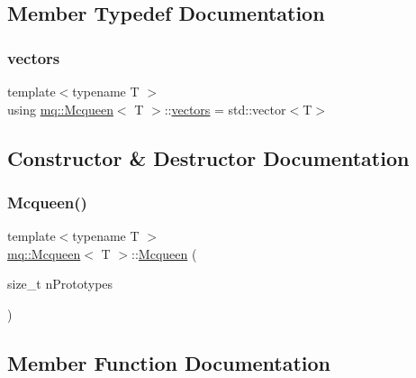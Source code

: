 \subsection{Member Typedef Documentation}
\mbox{\label{classmq_1_1Mcqueen_a4615619809177f994658d0841443a725}} 
\subsubsection{\texorpdfstring{vectors}{vectors}}
{\footnotesize\ttfamily template$<$typename T $>$ \\
using \mbox{\hyperlink{classmq_1_1Mcqueen}{mq\+::\+Mcqueen}}$<$ T $>$\+::\mbox{\hyperlink{classmq_1_1Mcqueen_a4615619809177f994658d0841443a725}{vectors}} =  std\+::vector$<$T$>$}



\subsection{Constructor \& Destructor Documentation}
\mbox{\label{classmq_1_1Mcqueen_ac732b06103447d1bac272fdb277b2d4d}} 
\subsubsection{\texorpdfstring{Mcqueen()}{Mcqueen()}}
{\footnotesize\ttfamily template$<$typename T $>$ \\
\mbox{\hyperlink{classmq_1_1Mcqueen}{mq\+::\+Mcqueen}}$<$ T $>$\+::\mbox{\hyperlink{classmq_1_1Mcqueen}{Mcqueen}} (\begin{DoxyParamCaption}\item[{size\+\_\+t}]{n\+Prototypes }\end{DoxyParamCaption})}



\subsection{Member Function Documentation}
\mbox{\label{classmq_1_1Mcqueen_ac9819e90d007adc2e32fa72c0c332a64}} 
